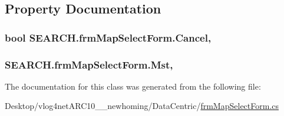 \subsection{Property Documentation}
\hypertarget{class_s_e_a_r_c_h_1_1frm_map_select_form_afa13153f55d301ef1db46eeabc5a4a00}{
\subsubsection[{Cancel}]{\setlength{\rightskip}{0pt plus 5cm}bool S\-E\-A\-R\-C\-H.\-frm\-Map\-Select\-Form.\-Cancel\hspace{0.3cm}{\ttfamily [get]}, {\ttfamily [set]}}}\label{class_s_e_a_r_c_h_1_1frm_map_select_form_afa13153f55d301ef1db46eeabc5a4a00}
\hypertarget{class_s_e_a_r_c_h_1_1frm_map_select_form_a340701db8706e8a0921814d0d4bccf42}{
\subsubsection[{Mst}]{ S\-E\-A\-R\-C\-H.\-frm\-Map\-Select\-Form.\-Mst\hspace{0.3cm}{\ttfamily [get]}, {\ttfamily [set]}}}\label{class_s_e_a_r_c_h_1_1frm_map_select_form_a340701db8706e8a0921814d0d4bccf42}


The documentation for this class was generated from the following file\-:\begin{DoxyCompactItemize}
\item 
Desktop/vlog4net\-A\-R\-C10\-\_\-\_\-newhoming/\-Data\-Centric/\hyperlink{frm_map_select_form_8cs}{frm\-Map\-Select\-Form.\-cs}\end{DoxyCompactItemize}
